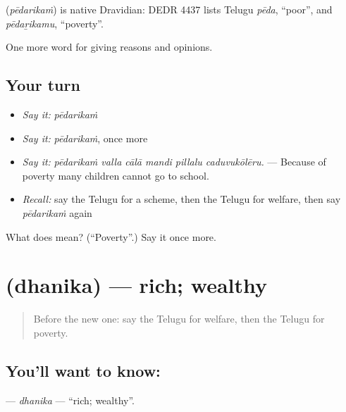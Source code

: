 \begin{cousinweb}
\textbf{} (\emph{pēdarikaṁ}) is native Dravidian: DEDR 4437 lists Telugu \emph{pēda}, \textquotedblleft{}poor\textquotedblright{}, and \emph{pēdaṟikamu}, \textquotedblleft{}poverty\textquotedblright{}.
\end{cousinweb}

\begin{grammarlens}[title={What you've built}]
One more word for giving reasons and opinions.
\end{grammarlens}

\subsection*{Your turn}
\begin{itemize}
\raggedright
  \item \emph{Say it:} \emph{pēdarikaṁ}
  \item \emph{Say it:} \emph{pēdarikaṁ}, once more
  \item \emph{Say it:} \emph{pēdarikaṁ valla cālā mandi pillalu caduvukōlēru.} — Because of poverty many children cannot go to school.
  \item \emph{Recall:} say the Telugu for a scheme, then the Telugu for welfare, then say \emph{pēdarikaṁ} again
\end{itemize}

\begin{tcolorbox}[breakable,colback=teal!4,colframe=teal!35!black,title={Before you move on}]
What does  mean? (\textquotedblleft{}Poverty\textquotedblright{}.) Say it once more.
\end{tcolorbox}
\section[\texorpdfstring{\te{ధనిక} (dhanika)}{ధనిక (dhanika)}]{ (dhanika) — rich; wealthy}

\label{lesson:TE-C404-dhanika}



\begin{quote}
Before the new one: say the Telugu for welfare, then the Telugu for poverty.
\end{quote}

\subsection*{You'll want to know: }
\textbf{} — \emph{dhanika} — \textquotedblleft{}rich; wealthy\textquotedblright{}.

